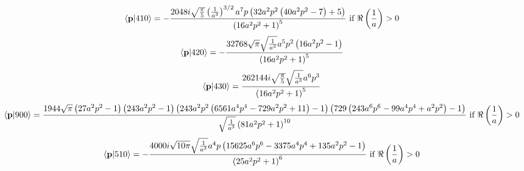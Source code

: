 \begin{equation*}
    \braket{\mathbf{p}|410} = -\frac{2048 i \sqrt{\frac{\pi }{5}} \left(\frac{1}{a^3}\right)^{3/2} a^7 p \left(32 a^2 p^2 \left(40 a^2p^2-7\right)+5\right)}{\left(16 a^2 p^2+1\right)^5}\text{ if }\Re\left(\frac{1}{a}\right)>0
\end{equation*}
\begin{equation*}
    \braket{\mathbf{p}|420} = -\frac{32768 \sqrt{\pi } \sqrt{\frac{1}{a^3}} a^5 p^2 \left(16 a^2 p^2-1\right)}{\left(16 a^2 p^2+1\right)^5}
\end{equation*}
\begin{equation*}
    \braket{\mathbf{p}|430} = \frac{262144 i \sqrt{\frac{\pi }{5}} \sqrt{\frac{1}{a^3}} a^6 p^3}{\left(16 a^2 p^2+1\right)^5}
\end{equation*}
\begin{equation*}
    \braket{\mathbf{p}|900} = \frac{1944 \sqrt{\pi } \left(27 a^2 p^2-1\right) \left(243 a^2 p^2-1\right) \left(243 a^2 p^2 \left(6561
    a^4 p^4-729 a^2 p^2+11\right)-1\right) \left(729 \left(243 a^6 p^6-99 a^4 p^4+a^2
    p^2\right)-1\right)}{\sqrt{\frac{1}{a^3}} \left(81 a^2 p^2+1\right)^{10}}\text{ if
    }\Re\left(\frac{1}{a}\right)>0
\end{equation*}
\begin{equation*}
    \braket{\mathbf{p}|510} = -\frac{4000 i \sqrt{10 \pi } \sqrt{\frac{1}{a^3}} a^4 p \left(15625 a^6 p^6-3375 a^4 p^4+135 a^2
    p^2-1\right)}{\left(25 a^2 p^2+1\right)^6}\text{ if }\Re\left(\frac{1}{a}\right)>0
\end{equation*}